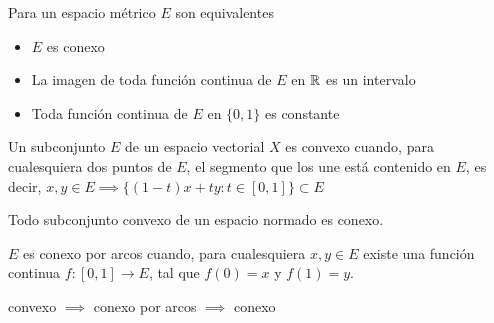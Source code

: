 Para un espacio métrico $E$ son equivalentes
\begin{itemize}
	\item $E$ es conexo
	\item La imagen de toda función continua de $E$ en $\mathbb{R}$ es un intervalo
	\item Toda función continua de $E$ en $\{0,1\}$ es constante
\end{itemize}
Un subconjunto $E$ de un espacio vectorial $X$ es convexo cuando, para cualesquiera dos puntos de $E$, el segmento que los une está contenido en $E$, es decir, $ x,y\in E\implies \{ (1-t)x+ty : t\in[0,1] \} \subset E$

Todo subconjunto convexo de un espacio normado es conexo.

$E$ es conexo por arcos cuando, para cualesquiera $x,y\in E$ existe una función continua $f:[0,1]\rightarrow E$, tal que $f(0) = x$ y $f(1) = y$.
\begin{center}
	convexo $\implies$ conexo por arcos $\implies$ conexo
\end{center}